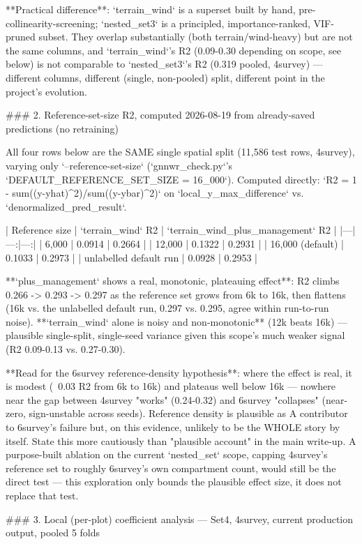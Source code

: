 **Practical difference**: `terrain_wind` is a superset built by hand, pre-collinearity-screening;
`nested_set3` is a principled, importance-ranked, VIF-pruned subset. They overlap substantially
(both terrain/wind-heavy) but are not the same columns, and `terrain_wind`'s R2 (0.09-0.30
depending on scope, see below) is not comparable to `nested_set3`'s R2 (0.319 pooled, 4survey) —
different columns, different (single, non-pooled) split, different point in the project's
evolution.

### 2. Reference-set-size R2, computed 2026-08-19 from already-saved predictions (no retraining)

All four rows below are the SAME single spatial split (11,586 test rows, 4survey), varying only
`--reference-set-size` (`gnnwr_check.py`'s `DEFAULT_REFERENCE_SET_SIZE = 16_000`). Computed
directly: `R2 = 1 - sum((y-yhat)^2)/sum((y-ybar)^2)` on `local_y_max_difference` vs.
`denormalized_pred_result`.

| Reference size | `terrain_wind` R2 | `terrain_wind_plus_management` R2 |
|---|---:|---:|
| 6,000 | 0.0914 | 0.2664 |
| 12,000 | 0.1322 | 0.2931 |
| 16,000 (default) | 0.1033 | 0.2973 |
| unlabelled default run | 0.0928 | 0.2953 |

**`plus_management` shows a real, monotonic, plateauing effect**: R2 climbs 0.266 -> 0.293 -> 0.297
as the reference set grows from 6k to 16k, then flattens (16k vs. the unlabelled default run,
0.297 vs. 0.295, agree within run-to-run noise). **`terrain_wind` alone is noisy and
non-monotonic** (12k beats 16k) — plausible single-split, single-seed variance given this scope's
much weaker signal (R2 0.09-0.13 vs. 0.27-0.30).

**Read for the 6survey reference-density hypothesis**: where the effect is real, it is modest
(~0.03 R2 from 6k to 16k) and plateaus well below 16k — nowhere near the gap between 4survey
"works" (0.24-0.32) and 6survey "collapses" (near-zero, sign-unstable across seeds). Reference
density is plausible as A contributor to 6survey's failure but, on this evidence, unlikely to be
the WHOLE story by itself. State this more cautiously than "plausible account" in the main
write-up. A purpose-built ablation on the current `nested_set` scope, capping 4survey's reference
set to roughly 6survey's own compartment count, would still be the direct test — this exploration
only bounds the plausible effect size, it does not replace that test.

### 3. Local (per-plot) coefficient analysis — Set4, 4survey, current production output, pooled 5 folds

